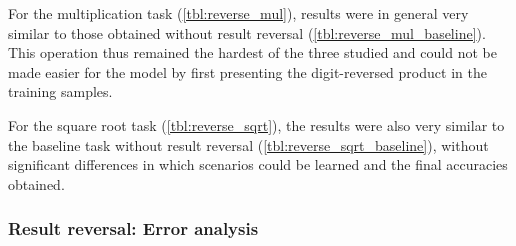 \begin{table}[H]
	\begin{minipage}[t]{0.47\linewidth}
		\hfill
		\label{tbl:reverse_mul}
	\end{minipage}
	\hfill %
	\begin{minipage}[t]{0.47\linewidth}
		\hfill
		\label{tbl:reverse_mul_baseline}
	\end{minipage}
\end{table}

For the multiplication task (\cref{tbl:reverse_mul}), results were in general very similar to those obtained without result reversal (\cref{tbl:reverse_mul_baseline}). This operation thus remained the hardest of the three studied and could not be made easier for the model by first presenting the digit-reversed product in the training samples.

\begin{table}[H]
	\begin{minipage}[t]{0.47\linewidth}
		\hfill
		\label{tbl:reverse_sqrt}
	\end{minipage}
	\hfill %
	\begin{minipage}[t]{0.47\linewidth}
		\hfill
		\label{tbl:reverse_sqrt_baseline}
	\end{minipage}
\end{table}

For the square root task (\cref{tbl:reverse_sqrt}), the results were also very similar to the baseline task without result reversal (\cref{tbl:reverse_sqrt_baseline}), without significant differences in which scenarios could be learned and  the final accuracies obtained.



\subsubsection{Result reversal: Error analysis}

